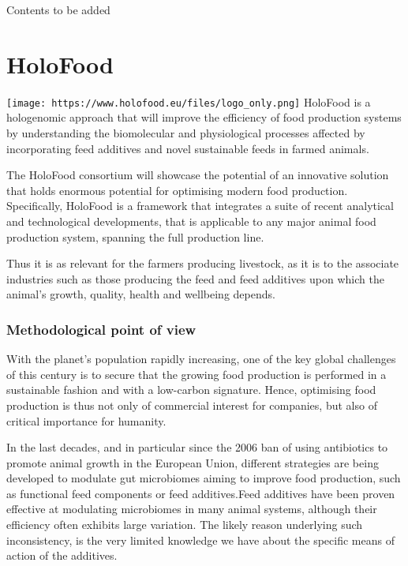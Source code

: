 \documentclass[
]{article}
\begin{document}
Contents to be added

\hypertarget{holofood}{%
\section{HoloFood}\label{holofood}}

\texttt{[image: https://www.holofood.eu/files/logo\_only.png]}
HoloFood is a hologenomic approach that will improve the efficiency of food production systems by understanding the biomolecular and physiological processes affected by incorporating feed additives and novel sustainable feeds in farmed animals.

The HoloFood consortium will showcase the potential of an innovative solution that holds enormous potential for optimising modern food production. Specifically, HoloFood is a framework that integrates a suite of recent analytical and technological developments, that is applicable to any major animal food production system, spanning the full production line.

Thus it is as relevant for the farmers producing livestock, as it is to the associate industries such as those producing the feed and feed additives upon which the animal's growth, quality, health and wellbeing depends.

\hypertarget{methodological-point-of-view}{%
\subsubsection*{Methodological point of view}\label{methodological-point-of-view}}

With the planet's population rapidly increasing, one of the key global challenges of this century is to secure that the growing food production is performed in a sustainable fashion and with a low-carbon signature. Hence, optimising food production is thus not only of commercial interest for companies, but also of critical importance for humanity.

In the last decades, and in particular since the 2006 ban of using antibiotics to promote animal growth in the European Union, different strategies are being developed to modulate gut microbiomes aiming to improve food production, such as functional feed components or feed additives.Feed additives have been proven effective at modulating microbiomes in many animal systems, although their efficiency often exhibits large variation. The likely reason underlying such inconsistency, is the very limited knowledge we have about the specific means of action of the additives.
\end{document}
